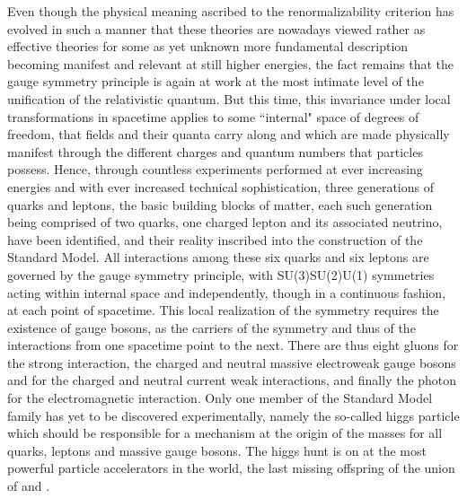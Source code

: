 \documentclass[a4paper,11pt]{article}
\begin{document}
Even though the physical meaning ascribed to the renormalizability criterion 
has evolved in such a manner that these theories are nowadays viewed rather
as effective theories for some as yet unknown more fundamental description
becoming manifest and relevant at still higher energies,\cite{Wein1}
the fact remains that the gauge symmetry principle is again at
work at the most intimate level of the unification of the relativistic
quantum. But this time, this invariance under local transformations in
spacetime applies to some ``internal" space of degrees of freedom,
that fields and their quanta carry along and which are made physically manifest
through the different charges and quantum numbers that particles possess.
Hence, through countless experiments performed at ever increasing
energies and with ever increased technical sophistication, three
generations of quarks and leptons, the basic building blocks of matter, 
each such generation being comprised of two quarks, one charged lepton
and its associated neutrino, have been identified, and their reality
inscribed into the construction of the Standard Model. All interactions
among these six quarks and six leptons are governed by the gauge
symmetry principle, with SU(3)\coordHE{}SU(2)\coordHE{}U(1)\coordHE{} symmetries
acting within internal space and independently, though in a continuous
fashion, at each point of spacetime. This local realization of the
symmetry requires the existence of gauge bosons, as the carriers of the
symmetry and thus of the interactions from one spacetime point to the next.
There are thus eight gluons for the strong interaction, the charged and neutral
massive electroweak gauge bosons \coordHE{} and \coordHE{} for the charged and
neutral current weak interactions, and finally the photon for the
electromagnetic interaction. Only one member of the Standard Model family
has yet to be discovered experimentally, namely the so-called higgs particle
which should be responsible for a mechanism at the origin of the masses for
all quarks, leptons and massive gauge bosons. The higgs hunt is on at the most
powerful particle accelerators in the world, the last missing offspring
of the union of \coordHE{} and \myHighlight{$\hbar$}\coordHE{}.
\end{document}
